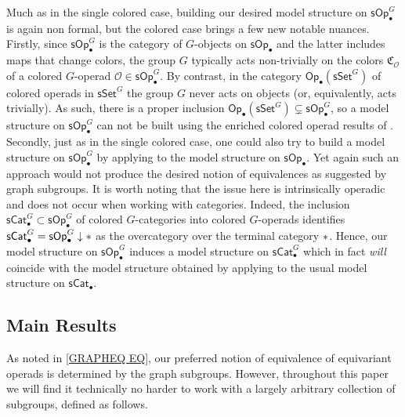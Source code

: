 \documentclass[a4paper,10pt
,draft
]{article}%
\numberwithin{equation}{section}
\numberwithin{figure}{section}
\theoremstyle{definition} %
\renewcommand{\O}{\ensuremath{\mathcal O}}
\newcommand{\1}{\ensuremath{\mathbbm 1}}%
\begin{document}
Much as in the single colored case,
building our desired model structure
on $\mathsf{sOp}^G_{\bullet}$
is again non formal,
but the colored case brings a few new notable nuances.
Firstly, since 
$\mathsf{sOp}_{\bullet}^G$
is the category of $G$-objects on 
$\mathsf{sOp}_{\bullet}$
and the latter
includes maps that change colors,
the group $G$ typically acts non-trivially
on the colors $\mathfrak{C}_{\mathcal{O}}$
of a colored $G$-operad
$\O \in \mathsf{sOp}_{\bullet}^G$.
By contrast, in the category
$\mathsf{Op}_{\bullet}(\mathsf{sSet}^G)$
of colored operads in $\mathsf{sSet}^G$
the group $G$ never acts on objects (or, equivalently, acts trivially).
As such, there is a proper inclusion
$\mathsf{Op}_{\bullet}(\mathsf{sSet}^G)
\subsetneq \mathsf{sOp}_{\bullet}^G$,
so a model structure on 
$\mathsf{sOp}_{\bullet}^G$
can not be built using the enriched colored operad results of \cite{Cav}.
Secondly, just as in the single colored case, 
one could also try to build a model structure
on $\mathsf{sOp}^G_{\bullet}$
by applying 
\cite[Prop 2.6]{Ste16}
to the model structure on $\mathsf{sOp}_\bullet$.
Yet again such an approach would not produce
the desired notion of equivalences as suggested by graph subgroups.
%
It is worth noting that the issue here is intrinsically operadic
and does not occur when working with categories.
Indeed, the inclusion
$\mathsf{sCat}^G_{\bullet} \subset 
\mathsf{sOp}^G_{\bullet}$
of colored $G$-categories into 
colored $G$-operads identifies
$\mathsf{sCat}^G_{\bullet} = 
\mathsf{sOp}^G_{\bullet} \downarrow \**$
as the overcategory over the terminal category $\**$.
Hence, our model structure on 
$\mathsf{sOp}^G_{\bullet}$
induces a model structure on 
$\mathsf{sCat}^G_{\bullet}$ which %
in fact \emph{will} 
coincide with the model structure obtained by applying
\cite[Prop. 2.6]{Ste16}
to the usual model structure on $\mathsf{sCat}_{\bullet}$.







\subsection{Main Results}


As noted in \eqref{GRAPHEQ EQ},
our preferred notion of equivalence of equivariant operads is determined by the graph subgroups.
However, throughout this paper we will find it technically 
no harder to work with a largely arbitrary collection of subgroups,
defined as follows.
\end{document}
